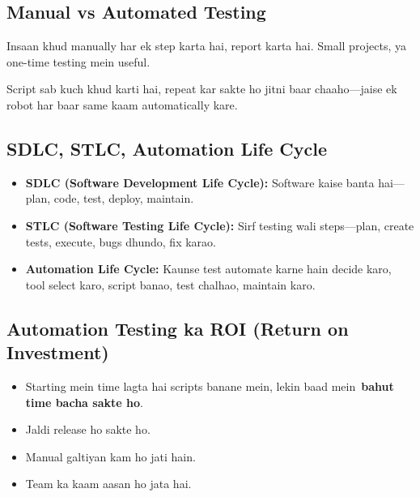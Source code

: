 \documentclass[a4paper,12pt]{article}
\newcommand{\checkmarkinline}{\textcolor{green}{\ding{51}}\,} %
\begin{document}
\subsection{Manual vs Automated Testing}

\begin{description}[font=\color{sectionblue}\bfseries,leftmargin=!,labelwidth=5cm]

\item[Manual Testing:]
Insaan khud manually har ek step karta hai, report karta hai. Small projects, ya one-time testing mein useful.

\item[Automated Testing:]
Script sab kuch khud karti hai, repeat kar sakte ho jitni baar chaaho—jaise ek robot har baar same kaam automatically kare.
\end{description}

\subsection{SDLC, STLC, Automation Life Cycle}

\begin{itemize}[leftmargin=*]
  \item \textbf{SDLC (Software Development Life Cycle):} Software kaise banta hai—plan, code, test, deploy, maintain.
  \item \textbf{STLC (Software Testing Life Cycle):} Sirf testing wali steps—plan, create tests, execute, bugs dhundo, fix karao.
  \item \textbf{Automation Life Cycle:} Kaunse test automate karne hain decide karo, tool select karo, script banao, test chalhao, maintain karo.
\end{itemize}

\subsection{Automation Testing ka ROI (Return on Investment)}

\begin{itemize}[leftmargin=*]
  \item Starting mein time lagta hai scripts banane mein, lekin baad mein \checkmarkinline \textbf{bahut time bacha sakte ho}.
  \item Jaldi release ho sakte ho.
  \item Manual galtiyan kam ho jati hain.
  \item Team ka kaam aasan ho jata hai.
\end{itemize}
\end{document}
